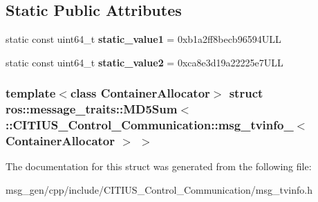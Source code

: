 \subsection*{\-Static \-Public \-Attributes}
\begin{DoxyCompactItemize}
\item 
\hypertarget{structros_1_1message__traits_1_1_m_d5_sum_3_01_1_1_c_i_t_i_u_s___control___communication_1_1msg_0d089ac2c877d81c0be201541d57e889_a0ba4cda1fb8b4955db227358fa051900}{static const uint64\-\_\-t {\bfseries static\-\_\-value1} = 0xb1a2ff8becb96594\-U\-L\-L}\label{structros_1_1message__traits_1_1_m_d5_sum_3_01_1_1_c_i_t_i_u_s___control___communication_1_1msg_0d089ac2c877d81c0be201541d57e889_a0ba4cda1fb8b4955db227358fa051900}

\item 
\hypertarget{structros_1_1message__traits_1_1_m_d5_sum_3_01_1_1_c_i_t_i_u_s___control___communication_1_1msg_0d089ac2c877d81c0be201541d57e889_a154d8572b5e489ce18db0c17bb1b845d}{static const uint64\-\_\-t {\bfseries static\-\_\-value2} = 0xca8e3d19a22225e7\-U\-L\-L}\label{structros_1_1message__traits_1_1_m_d5_sum_3_01_1_1_c_i_t_i_u_s___control___communication_1_1msg_0d089ac2c877d81c0be201541d57e889_a154d8572b5e489ce18db0c17bb1b845d}

\end{DoxyCompactItemize}
\subsubsection*{template$<$class Container\-Allocator$>$ struct ros\-::message\-\_\-traits\-::\-M\-D5\-Sum$<$ \-::\-C\-I\-T\-I\-U\-S\-\_\-\-Control\-\_\-\-Communication\-::msg\-\_\-tvinfo\-\_\-$<$ Container\-Allocator $>$ $>$}



\-The documentation for this struct was generated from the following file\-:\begin{DoxyCompactItemize}
\item 
msg\-\_\-gen/cpp/include/\-C\-I\-T\-I\-U\-S\-\_\-\-Control\-\_\-\-Communication/msg\-\_\-tvinfo.\-h\end{DoxyCompactItemize}
